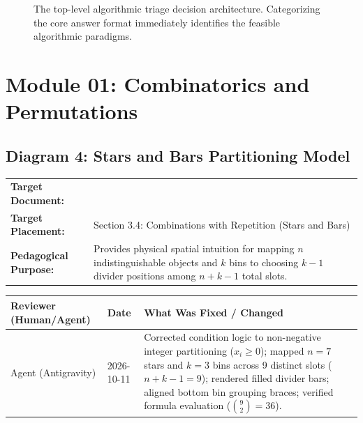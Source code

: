 \documentclass[11pt,a4paper]{article}
\newcommand{\breadcrumb}[3]{
    \par\vspace{0.15cm}
    \noindent\begin{tabularx}{\textwidth}{|l|X|}
    \hline
    \textbf{Target Document:} & \texttt{\detokenize{#1}} \\
    \textbf{Target Placement:} & #2 \\
    \textbf{Pedagogical Purpose:} & #3 \\
    \hline
    \end{tabularx}
    \vspace{0.15cm}\par
}
\newcommand{\diagramaudit}[3]{
    \par\vspace{0.12cm}
    \noindent\begin{tabularx}{\textwidth}{|l|l|>{\raggedright\arraybackslash}X|}
    \hline
    \textbf{Reviewer (Human/Agent)} & \textbf{Date} & \textbf{What Was Fixed / Changed} \\ \hline
    #1 & #2 & #3 \\ \hline
    \end{tabularx}
    \vspace{0.12cm}\par
}
\begin{document}
\begin{figure}[htbp]
\caption{The top-level algorithmic triage decision architecture. Categorizing the core answer format immediately identifies the feasible algorithmic paradigms.}
\end{figure}

\newpage
\section{Module 01: Combinatorics and Permutations}

\subsection{Diagram 4: Stars and Bars Partitioning Model}

\breadcrumb{01.combinatorics_permutations.tex}{Section 3.4: Combinations with Repetition (Stars and Bars)}{Provides physical spatial intuition for mapping $n$ indistinguishable objects and $k$ bins to choosing $k-1$ divider positions among $n + k - 1$ total slots.}

\diagramaudit{Agent (Antigravity)}{2026-10-11}{Corrected condition logic to non-negative integer partitioning ($x_i \ge 0$); mapped $n=7$ stars and $k=3$ bins across 9 distinct slots ($n+k-1=9$); rendered filled divider bars; aligned bottom bin grouping braces; verified formula evaluation ($\binom{9}{2} = 36$).}
\end{document}
